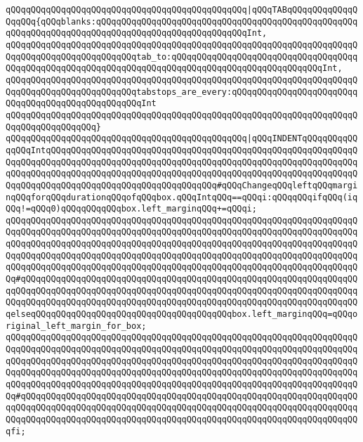 \verb|qQQqqQQqqQQqqQQqqQQqqQQqqQQqqQQqqQQqqQQqqQQqqQQq|\verb#|qQQqTABqQQqqQQqqQQqqQQqqQQq{qQQqblanks:qQQqqQQqqQQqqQQqqQQqqQQqqQQqqQQqqQQqqQQqqQQqqQQqqQQqqQQqqQQqqQQqqQQqqQQqqQQqqQQqqQQqqQQqqQQqqQQqqQQqInt,#\newline
\verb|qQQqqQQqqQQqqQQqqQQqqQQqqQQqqQQqqQQqqQQqqQQqqQQqqQQqqQQqqQQqqQQqqQQqqQQqqQQqqQQqqQQqqQQqqQQqqQQqtab_to:qQQqqQQqqQQqqQQqqQQqqQQqqQQqqQQqqQQqqQQqqQQqqQQqqQQqqQQqqQQqqQQqqQQqqQQqqQQqqQQqqQQqqQQqqQQqqQQqqQQqInt,|\newline
\verb|qQQqqQQqqQQqqQQqqQQqqQQqqQQqqQQqqQQqqQQqqQQqqQQqqQQqqQQqqQQqqQQqqQQqqQQqqQQqqQQqqQQqqQQqqQQqqQQqtabstops_are_every:qQQqqQQqqQQqqQQqqQQqqQQqqQQqqQQqqQQqqQQqqQQqqQQqqQQqInt|\newline
\verb|qQQqqQQqqQQqqQQqqQQqqQQqqQQqqQQqqQQqqQQqqQQqqQQqqQQqqQQqqQQqqQQqqQQqqQQqqQQqqQQqqQQqqQQq}|\newline
\newline
\verb|qQQqqQQqqQQqqQQqqQQqqQQqqQQqqQQqqQQqqQQqqQQqqQQq|\verb#|qQQqINDENTqQQqqQQqqQQqqQQqIntqQQqqQQqqQQqqQQqqQQqqQQqqQQqqQQqqQQqqQQqqQQqqQQqqQQqqQQqqQQqqQQqqQQqqQQqqQQqqQQqqQQqqQQqqQQqqQQqqQQqqQQqqQQqqQQqqQQqqQQqqQQqqQQqqQQqqQQqqQQqqQQqqQQqqQQqqQQqqQQqqQQqqQQqqQQqqQQqqQQqqQQqqQQqqQQqqQQqqQQqqQQqqQQqqQQqqQQqqQQqqQQqqQQqqQQqqQQqqQQqqQQq#\verb|#qQQqChangeqQQqleftqQQqmarginqQQqforqQQqdurationqQQqofqQQqbox.qQQqIntqQQq==qQQqi:qQQqqQQqifqQQq(iqQQq!=qQQq0)qQQqqQQqqQQqbox.left_marginqQQq+=qQQqi;|\newline
\verb|qQQqqQQqqQQqqQQqqQQqqQQqqQQqqQQqqQQqqQQqqQQqqQQqqQQqqQQqqQQqqQQqqQQqqQQqqQQqqQQqqQQqqQQqqQQqqQQqqQQqqQQqqQQqqQQqqQQqqQQqqQQqqQQqqQQqqQQqqQQqqQQqqQQqqQQqqQQqqQQqqQQqqQQqqQQqqQQqqQQqqQQqqQQqqQQqqQQqqQQqqQQqqQQqqQQqqQQqqQQqqQQqqQQqqQQqqQQqqQQqqQQqqQQqqQQqqQQqqQQqqQQqqQQqqQQqqQQqqQQqqQQqqQQqqQQqqQQqqQQqqQQqqQQqqQQqqQQqqQQqqQQqqQQqqQQqqQQqqQQqqQQqqQQqqQQq#qQQqqQQqqQQqqQQqqQQqqQQqqQQqqQQqqQQqqQQqqQQqqQQqqQQqqQQqqQQqqQQqqQQqqQQqqQQqqQQqqQQqqQQqqQQqqQQqqQQqqQQqqQQqqQQqqQQqqQQqqQQqqQQqqQQqqQQqqQQqqQQqqQQqqQQqqQQqqQQqqQQqqQQqqQQqqQQqqQQqqQQqqQQqqQQqqQQqqQQqqQQqqQQqelseqQQqqQQqqQQqqQQqqQQqqQQqqQQqqQQqqQQqqQQqbox.left_marginqQQq=qQQqoriginal_left_margin_for_box;|\newline
\verb|qQQqqQQqqQQqqQQqqQQqqQQqqQQqqQQqqQQqqQQqqQQqqQQqqQQqqQQqqQQqqQQqqQQqqQQqqQQqqQQqqQQqqQQqqQQqqQQqqQQqqQQqqQQqqQQqqQQqqQQqqQQqqQQqqQQqqQQqqQQqqQQqqQQqqQQqqQQqqQQqqQQqqQQqqQQqqQQqqQQqqQQqqQQqqQQqqQQqqQQqqQQqqQQqqQQqqQQqqQQqqQQqqQQqqQQqqQQqqQQqqQQqqQQqqQQqqQQqqQQqqQQqqQQqqQQqqQQqqQQqqQQqqQQqqQQqqQQqqQQqqQQqqQQqqQQqqQQqqQQqqQQqqQQqqQQqqQQqqQQqqQQqqQQqqQQq#qQQqqQQqqQQqqQQqqQQqqQQqqQQqqQQqqQQqqQQqqQQqqQQqqQQqqQQqqQQqqQQqqQQqqQQqqQQqqQQqqQQqqQQqqQQqqQQqqQQqqQQqqQQqqQQqqQQqqQQqqQQqqQQqqQQqqQQqqQQqqQQqqQQqqQQqqQQqqQQqqQQqqQQqqQQqqQQqqQQqqQQqqQQqqQQqqQQqqQQqqQQqqQQqfi;|\newline
